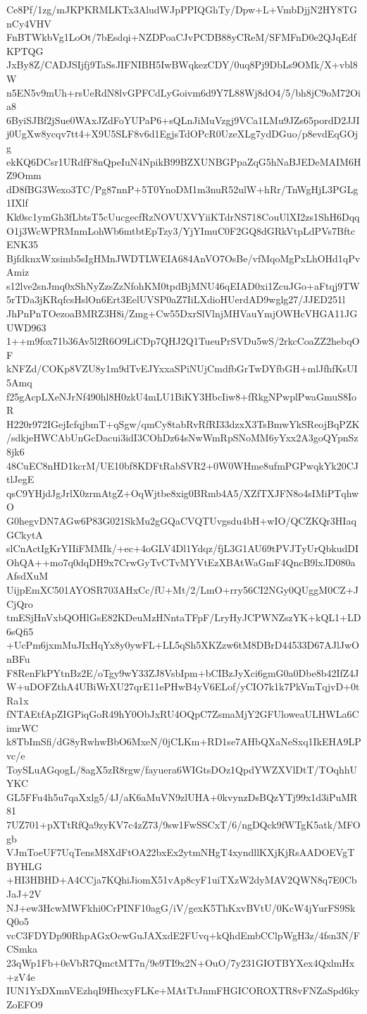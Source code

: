 Ce8Pf/1zg/mJKPKRMLKTx3AludWJpPPIQGhTy/Dpw+L+VmbDjjN2HY8TGnCy4VHV
FnBTWkbVg1LoOt/7bEsdqi+NZDPoaCJvPCDB88yCReM/SFMFnD0e2QJqEdfKPTQG
JxBy8Z/CADJSIjfj9TaSsJIFNIBH5IwBWqkezCDY/0uq8Pj9DbLs9OMk/X+vbl8W
n5EN5v9mUh+rsUeRdN8lvGPFCdLyGoivm6d9Y7L88Wj8dO4/5/bh8jC9oM72Oia8
6ByiSJBf2jSue0WAxJZdFoYUPaP6+sQLnJiMuVzgj9VCa1LMu9JZs65pordD2JJI
j0UgXw8ycqv7tt4+X9U5SLF8v6d1EgjsTdOPcR0UzeXLg7ydDGuo/p8evdEqGOjg
ekKQ6DCsr1URdfF8nQpeIuN4NpikB99BZXUNBGPpaZqG5hNaBJEDeMAIM6HZ9Omm
dD8fBG3Wexo3TC/Pg87nnP+5T0YnoDM1m3nuR52ulW+hRr/TnWgHjL3PGLg1IXlf
Kk0sc1ymGh3fLbtsT5cUucgecfRzNOVUXVYiiKTdrNS718CouUlXI2zs1ShH6Dqq
O1j3WcWPRMnmLohWb6mtbtEpTzy3/YjYImuC0F2GQ8dGRkVtpLdPVs7BftcENK35
BjfdknxWxsimb5sIgHMnJWDTLWEIA684AnVO7OsBe/vfMqoMgPxLhOHd1qPvAmiz
s12lve2snJmq0xShNyZzsZzNfohKM0tpdBjMNU46qEIAD0xi1ZcuJGo+aFtqj9TW
5rTDa3jKRqfcsHslOn6Ert3EelUVSP0aZ7IiLXdioHUerdAD9wglg27/JJED251l
JhPnPnTOezoaBMRZ3H8i/Zmg+Cw55DxrSlVlnjMHVauYmjOWHcVHGA11JGUWD963
1++m9fox71b36Av5l2R6O9LiCDp7QHJ2Q1TueuPrSVDu5wS/2rkcCoaZZ2hebqOF
kNFZd/COKp8VZU8y1m9dTvEJYxxaSPiNUjCmdfbGrTwDYfbGH+mlJfhfKsUI5Amq
f25gAcpLXeNJrNf490hl8H0zkU4mLU1BiKY3HbcIiw8+fRkgNPwplPwaGmuS8IoR
H220r972IGejIcfqjbmT+qSgw/qmCy8tabRvRfRI33dzxX3TsBmwYkSReojBqPZK
/sdkjeHWCAbUnGcDacui3idI3COhDz64sNwWmRpSNoMM6yYxx2A3goQYpnSz8jk6
48CuEC8nHD1kcrM/UE10bf8KDFtRabSVR2+0W0WHme8ufmPGPwqkYk20CJtlJegE
qsC9YHjdJgJrlX0zrmAtgZ+OqWjtbe8xig0BRmb4A5/XZfTXJFN8o4sIMiPTqhwO
G0hegvDN7AGw6P83G021SkMu2gGQaCVQTUvgsdu4bH+wIO/QCZKQr3HIaqGCkytA
slCnActIgKrYIIiFMMIk/+ec+4oGLV4Dl1Ydqz/fjL3G1AU69tPVJTyUrQbkudDI
OhQA++mo7q0dqDH9x7CrwGyTvCTvMYVtEzXBAtWaGmF4QncB9lxJD080aAfsdXuM
UijpEmXC501AYOSR703AHxCc/fU+Mt/2/LmO+rry56CI2NGy0QUggM0CZ+JCjQro
tmESjHnVxbQOHlGsE82KDeuMzHNntaTFpF/LryHyJCPWNZszYK+kQL1+LD6sQfi5
+UcPm6jxmMuJIxHqYx8y0ywFL+LL5qSh5XKZzw6tM8DBrD44533D67AJlJwOnBFu
F8RenFkPYtnBz2E/oTgy9wY33ZJ8VsbIpm+bCIBzJyXci6gmG0a0Dbe8b42IfZ4J
W+uDOFZthA4UBiWrXU27qrE11ePHwB4yV6ELof/yCIO7k1k7PkVmTqjvD+0tRa1x
fNTAEtfApZIGPiqGoR49hY0ObJxRU4OQpC7ZsmaMjY2GFUloweaULHWLa6CimrWC
k8TbImSfi/dG8yRwhwBbO6MxeN/0jCLKm+RD1se7AHbQXaNeSxq1IkEHA9LPvc/e
ToySLuAGqogL/8agX5zR8rgw/fayuera6WIGtsDOz1QpdYWZXVlDtT/TOqhhUYKC
GL5FFu4h5u7qaXxlg5/4J/aK6aMuVN9zlUHA+0kvynzDsBQzYTj99x1d3iPuMR81
7UZ701+pXTtRfQa9zyKV7c4zZ73/9sw1FwSSCxT/6/ngDQck9fWTgK5atk/MFOgb
VJmToeUF7UqTensM8XdFtOA22bxEx2ytmNHgT4xyndllKXjKjRsAADOEVgTBYHLG
+HI3HBHD+A4CCja7KQhiJiomX51vAp8cyF1uiTXzW2dyMAV2QWN8q7E0CbJaJ+2V
NJ+ew3HcwMWFkhi0CrPINF10agG/iV/gexK5ThKxvBVtU/0KcW4jYurFS9SkQ0o5
vcC3FDYDp90RhpAGxOcwGuJAXxdE2FUvq+kQhdEmbCClpWgH3z/4fsn3N/FCSmka
23qWp1Fb+0eVbR7QmctMT7n/9e9TI9x2N+OuO/7y231GIOTBYXex4QxlmHx+zV4e
IUN1YxDXmnVEzhqI9HhcxyFLKe+MAtTtJnmFHGICOROXTR8vFNZaSpd6kyZoEFO9
